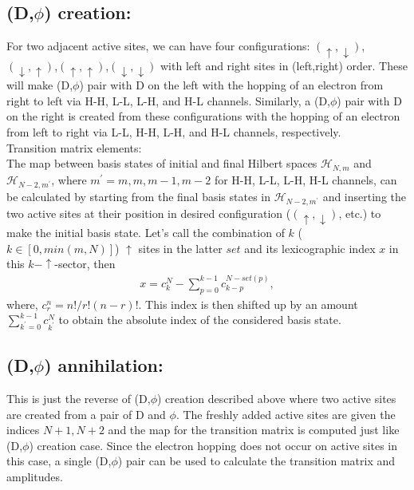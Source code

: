 \documentclass[a4paper]{revtex4-1} %
\newcommand{\da}{\downarrow}
\newcommand{\ua}{\uparrow}
\begin{document}
\subsection{(D,$\phi$) creation: }
For two adjacent active sites,
we can have four configurations:
$(\ua,\da)$, $(\da,\ua)$,$(\ua,\ua)$,$(\da,\da)$ with left and right sites in (left,right) order.
These will make (D,$\phi$) pair with D on the left 
with the hopping of an electron from right to left 
via H-H, L-L, L-H, and H-L channels.
Similarly,
a (D,$\phi$) pair with D on the right is created from these configurations
with the hopping of an electron from left to right
via L-L, H-H, L-H, and H-L channels, respectively.
\\Transition matrix elements:\\
The map between basis states of initial and final Hilbert spaces
$\mathcal{H}_{N,m}$ and $\mathcal{H}_{N-2,m^\prime}$, 
where $m^\prime=m,m,m-1,m-2$ for H-H, L-L, L-H, H-L channels,
can be calculated by starting from the final basis states in $\mathcal{H}_{N-2,m^\prime}$ 
and inserting the two active sites
at their position in desired configuration ($(\ua,\da)$, etc.) to make the initial basis state.
Let's call the combination of $k$ ($k\in [0,min(m,N)]$) $\ua$ sites in the latter $set$ and its lexicographic index
$x$ in this $k-\ua$-sector, then
\begin{eqnarray*}
x = c^N_ k - 
   \sum_{p=0}^{k-1}c^{N - set(p)}_{ k - p},
\end{eqnarray*}  
 where, $c^n_r = {n!}/{r!(n-r)!}$.
  This index is then shifted up by an amount 
$\sum_{k^\prime=0}^{k-1} c^N_{k^\prime}$ to obtain the absolute index of the considered basis state.









\subsection{(D,$\phi$) annihilation: }
This is just the reverse of (D,$\phi$) creation described above where two active sites are created
from a pair of D and $\phi$. The freshly added active sites are given the indices $N+1,N+2$
and the map for the transition matrix is computed just like (D,$\phi$) creation case.
Since the electron hopping does not occur on active sites in this case,
a single (D,$\phi$) pair can be used to calculate the transition matrix and amplitudes.
\end{document}
